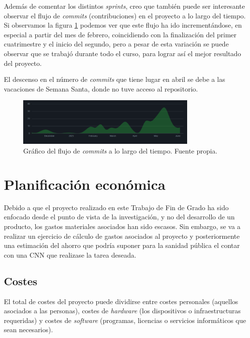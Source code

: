 Además de comentar los distintos \textit{sprints}, creo que también puede ser interesante observar el flujo de \textit{commits} (contribuciones) en el proyecto a lo largo del tiempo. Si observamos la figura \ref{fig:flujo} podemos ver que este flujo ha ido incrementándose, en especial a partir del mes de febrero, coincidiendo con la finalización del primer cuatrimestre y el inicio del segundo, pero a pesar de esta variación se puede observar que se trabajó durante todo el curso, para lograr así el mejor resultado del proyecto.

El descenso en el número de \textit{commits} que tiene lugar en abril se debe a las vacaciones de Semana Santa, donde no tuve acceso al repositorio. 

\begin{figure}[h]
    \centering
    \includegraphics[width=0.8\textwidth]{img/commits_flujo.png}
    \caption{Gráfico del flujo de \textit{commits} a lo largo del tiempo. Fuente propia.}
    \label{fig:flujo}
\end{figure}

\section{Planificación económica}

Debido a que el proyecto realizado en este Trabajo de Fin de Grado ha sido enfocado desde el punto de vista de la investigación, y no del desarrollo de un producto, los gastos materiales asociados han sido escasos. Sin embargo, se va a realizar un ejercicio de cálculo de gastos asociados al proyecto y posteriormente una estimación del ahorro que podría suponer para la sanidad pública el contar con una CNN que realizase la tarea deseada.

\subsection{Costes}

El total de costes del proyecto puede dividirse entre costes personales (aquellos asociados a las personas), costes de \textit{hardware} (los dispositivos o infraestructuras requeridas) y costes de \textit{software} (programas, licencias o servicios informáticos que sean necesarios).

